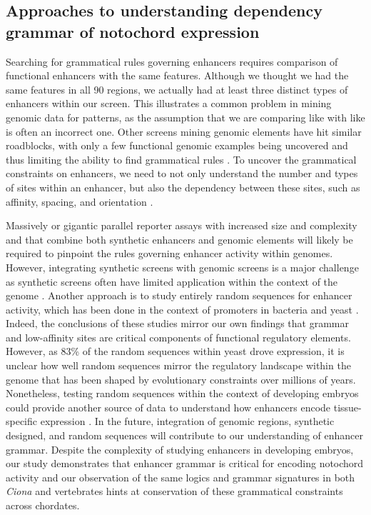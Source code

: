 \subsection{Approaches to understanding dependency grammar of notochord expression}

Searching for grammatical rules governing enhancers requires comparison of functional enhancers with the same features. Although we thought we had the same features in all 90 regions, we actually had at least three distinct types of enhancers within our screen. This illustrates a common problem in mining genomic data for patterns, as the assumption that we are comparing like with like is often an incorrect one. Other screens mining genomic elements have hit similar roadblocks, with only a few functional genomic examples being uncovered and thus limiting the ability to find grammatical rules \cite{king2020a}.  To uncover the grammatical constraints on enhancers, we need to not only understand the number and types of sites within an enhancer, but also the dependency between these sites, such as affinity, spacing, and orientation \cite{jindal2021}. 

Massively or gigantic parallel reporter assays with increased size and complexity and that combine both synthetic enhancers and genomic elements will likely be required to pinpoint the rules governing enhancer activity within genomes. However, integrating synthetic screens with genomic screens is a major challenge as synthetic screens often have limited application within the context of the genome \cite{king2020a}. Another approach is to study entirely random sequences for enhancer activity, which has been done in the context of promoters in bacteria and yeast \cite{yona2018,deboer2020a}. Indeed, the conclusions of these studies mirror our own findings that grammar and low-affinity sites are critical components of functional regulatory elements. However, as 83\% of the random sequences within yeast drove expression, it is unclear how well random sequences mirror the regulatory landscape within the genome that has been shaped by evolutionary constraints over millions of years. Nonetheless, testing random sequences within the context of developing embryos could provide another source of data to understand how enhancers encode tissue-specific expression \cite{galupa2022}. In the future, integration of genomic regions, synthetic designed, and random sequences will contribute to our understanding of enhancer grammar. Despite the complexity of studying enhancers in developing embryos, our study demonstrates that enhancer grammar is critical for encoding notochord activity and our observation of the same logics and grammar signatures in both \textit{Ciona} and vertebrates hints at conservation of these grammatical constraints across chordates. 

